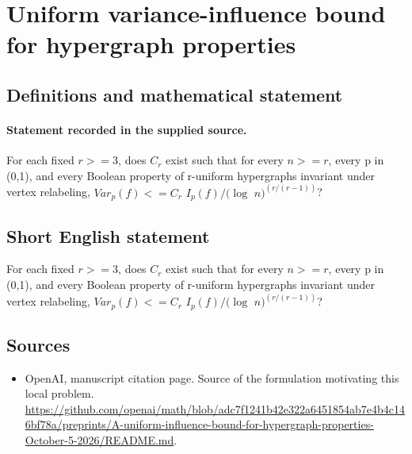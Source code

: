 \documentclass[11pt]{article}
\begin{document}
\section*{Uniform variance-influence bound for hypergraph properties}\label{30007094}
\subsection{Definitions and mathematical statement}
\paragraph{Statement recorded in the supplied source.}
For each fixed $r>=3$, does $C_r$ exist such that for every $n>=r$, every p in (0,1), and every Boolean property of r-uniform hypergraphs invariant under vertex relabeling, $Var_p(f)<=C_r$ $I_p(f)/(\log $ $n)^(r/(r-1))$?
\subsection{Short English statement}
For each fixed $r>=3$, does $C_r$ exist such that for every $n>=r$, every p in (0,1), and every Boolean property of r-uniform hypergraphs invariant under vertex relabeling, $Var_p(f)<=C_r$ $I_p(f)/(\log $ $n)^(r/(r-1))$?
\subsection{Sources}
\begin{itemize}
\item[S1] OpenAI, manuscript citation page. Source of the formulation motivating this local problem.
\url{https://github.com/openai/math/blob/adc7f1241b42e322a6451854ab7e4b4c146bf78a/preprints/A-uniform-influence-bound-for-hypergraph-properties-October-5-2026/README.md}.
\end{itemize}
\end{document}
